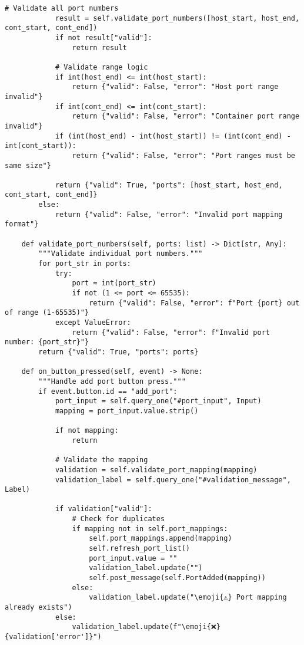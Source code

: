 \documentclass[11pt,a4paper]{article}
\newcommand{\emoji}[1]{{\emojifont #1}}
\begin{document}
\begin{lstlisting}[caption={ValidatedInput Implementation}]
            # Validate all port numbers
            result = self.validate_port_numbers([host_start, host_end, cont_start, cont_end])
            if not result["valid"]:
                return result
                
            # Validate range logic
            if int(host_end) <= int(host_start):
                return {"valid": False, "error": "Host port range invalid"}
            if int(cont_end) <= int(cont_start):
                return {"valid": False, "error": "Container port range invalid"}
            if (int(host_end) - int(host_start)) != (int(cont_end) - int(cont_start)):
                return {"valid": False, "error": "Port ranges must be same size"}
                
            return {"valid": True, "ports": [host_start, host_end, cont_start, cont_end]}
        else:
            return {"valid": False, "error": "Invalid port mapping format"}
            
    def validate_port_numbers(self, ports: list) -> Dict[str, Any]:
        """Validate individual port numbers."""
        for port_str in ports:
            try:
                port = int(port_str)
                if not (1 <= port <= 65535):
                    return {"valid": False, "error": f"Port {port} out of range (1-65535)"}
            except ValueError:
                return {"valid": False, "error": f"Invalid port number: {port_str}"}
        return {"valid": True, "ports": ports}
        
    def on_button_pressed(self, event) -> None:
        """Handle add port button press."""
        if event.button.id == "add_port":
            port_input = self.query_one("#port_input", Input)
            mapping = port_input.value.strip()
            
            if not mapping:
                return
                
            # Validate the mapping
            validation = self.validate_port_mapping(mapping)
            validation_label = self.query_one("#validation_message", Label)
            
            if validation["valid"]:
                # Check for duplicates
                if mapping not in self.port_mappings:
                    self.port_mappings.append(mapping)
                    self.refresh_port_list()
                    port_input.value = ""
                    validation_label.update("")
                    self.post_message(self.PortAdded(mapping))
                else:
                    validation_label.update("\emoji{⚠} Port mapping already exists")
            else:
                validation_label.update(f"\emoji{❌} {validation['error']}")
                

\end{lstlisting}
\end{document}
